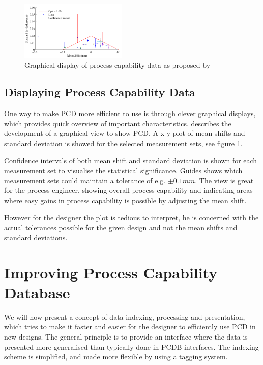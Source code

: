 \documentclass[aip,amsmath, reprint, author-year]{revtex4-1}
\begin{document}
\begin{figure}
\includegraphics[width=0.45\textwidth]{bias_std.pdf}
\caption{\label{fig:bias_std} Graphical display of process capability data as proposed by\cite{thornton2000use}}
\end{figure}

\subsection{Displaying Process Capability Data}
One way to make PCD more efficient to use is through clever graphical displays, which provides quick overview of important characteristics. \cite{thornton2000use} describes the development of a graphical view to show PCD. A x-y plot of mean shifts and standard deviation is showed for the selected measurement sets, see figure \ref{fig:bias_std}. 

Confidence intervals of both mean shift and standard deviation is shown for each measurement set to visualise the statistical significance. Guides shows which measurement sets could maintain a tolerance of e.g. $\pm 0.1 mm$. The view is great for the process engineer, showing overall process capability and indicating areas where easy gains in process capability is possible by adjusting the mean shift. 

However for the designer the plot is tedious to interpret, he is concerned with the actual tolerances possible for the given design and not the mean shifts and standard deviations.

\section{Improving Process Capability Database}
We will now present a concept of data indexing, processing and presentation, which tries to make it faster and easier for the designer to efficiently use PCD in new designs. The general principle is to provide an interface where the data is presented more generalised than typically done in PCDB interfaces. The indexing scheme is simplified, and made more flexible by using a tagging system. 
\end{document}
